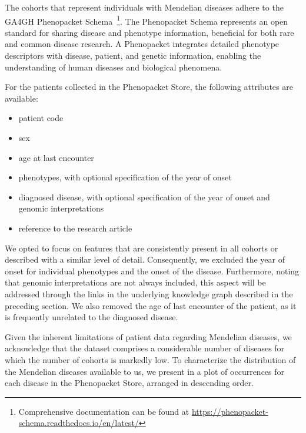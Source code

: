 The cohorts that represent individuals with Mendelian diseases adhere to the GA4GH Phenopacket Schema~\cite{jacobsen2022ga4ghPhenopacketSchema}\footnote{Comprehensive documentation can be found at \url{https://phenopacket-schema.readthedocs.io/en/latest/}}. The Phenopacket Schema represents an open standard for sharing disease and phenotype information, beneficial for both rare and common disease research. A Phenopacket integrates detailed phenotype descriptors with disease, patient, and genetic information, enabling the understanding of human diseases and biological phenomena.

For the patients collected in the Phenopacket Store, the following attributes are available:
\begin{itemize}
  \item patient code
  \item sex
  \item age at last encounter
  \item phenotypes, with optional specification of the year of onset
  \item diagnosed disease, with optional specification of the year of onset and genomic interpretations
  \item reference to the research article
\end{itemize}

We opted to focus on features that are consistently present in all cohorts or described with a similar level of detail. Consequently, we excluded the year of onset for individual phenotypes and the onset of the disease. Furthermore, noting that genomic interpretations are not always included, this aspect will be addressed through the links in the underlying knowledge graph described in the preceding section. We also removed the age of last encounter of the patient, as it is frequently unrelated to the diagnosed disease.

Given the inherent limitations of patient data regarding Mendelian diseases, we acknowledge that the dataset comprises a considerable number of diseases for which the number of cohorts is markedly low. To characterize the distribution of the Mendelian diseases available to us, we present in  a plot of occurrences for each disease in the Phenopacket Store, arranged in descending order.


